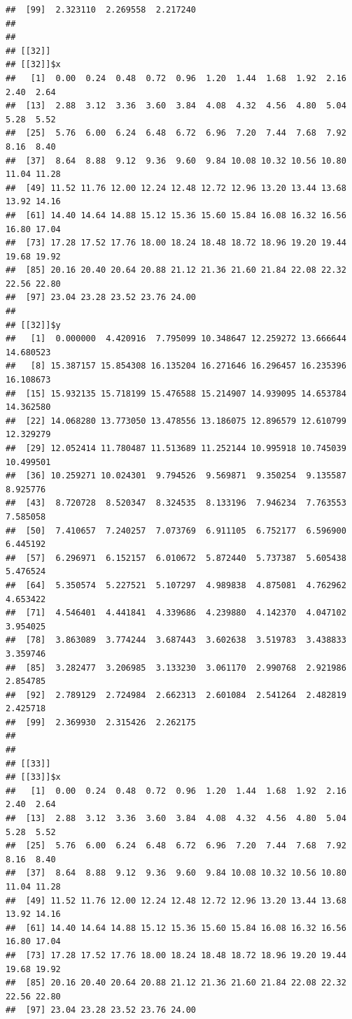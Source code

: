 \documentclass[
  ignorenonframetext,
]{beamer}
\begin{document}
\begin{frame}[fragile]{}
\begin{verbatim}
##  [99]  2.323110  2.269558  2.217240
## 
## 
## [[32]]
## [[32]]$x
##   [1]  0.00  0.24  0.48  0.72  0.96  1.20  1.44  1.68  1.92  2.16  2.40  2.64
##  [13]  2.88  3.12  3.36  3.60  3.84  4.08  4.32  4.56  4.80  5.04  5.28  5.52
##  [25]  5.76  6.00  6.24  6.48  6.72  6.96  7.20  7.44  7.68  7.92  8.16  8.40
##  [37]  8.64  8.88  9.12  9.36  9.60  9.84 10.08 10.32 10.56 10.80 11.04 11.28
##  [49] 11.52 11.76 12.00 12.24 12.48 12.72 12.96 13.20 13.44 13.68 13.92 14.16
##  [61] 14.40 14.64 14.88 15.12 15.36 15.60 15.84 16.08 16.32 16.56 16.80 17.04
##  [73] 17.28 17.52 17.76 18.00 18.24 18.48 18.72 18.96 19.20 19.44 19.68 19.92
##  [85] 20.16 20.40 20.64 20.88 21.12 21.36 21.60 21.84 22.08 22.32 22.56 22.80
##  [97] 23.04 23.28 23.52 23.76 24.00
## 
## [[32]]$y
##   [1]  0.000000  4.420916  7.795099 10.348647 12.259272 13.666644 14.680523
##   [8] 15.387157 15.854308 16.135204 16.271646 16.296457 16.235396 16.108673
##  [15] 15.932135 15.718199 15.476588 15.214907 14.939095 14.653784 14.362580
##  [22] 14.068280 13.773050 13.478556 13.186075 12.896579 12.610799 12.329279
##  [29] 12.052414 11.780487 11.513689 11.252144 10.995918 10.745039 10.499501
##  [36] 10.259271 10.024301  9.794526  9.569871  9.350254  9.135587  8.925776
##  [43]  8.720728  8.520347  8.324535  8.133196  7.946234  7.763553  7.585058
##  [50]  7.410657  7.240257  7.073769  6.911105  6.752177  6.596900  6.445192
##  [57]  6.296971  6.152157  6.010672  5.872440  5.737387  5.605438  5.476524
##  [64]  5.350574  5.227521  5.107297  4.989838  4.875081  4.762962  4.653422
##  [71]  4.546401  4.441841  4.339686  4.239880  4.142370  4.047102  3.954025
##  [78]  3.863089  3.774244  3.687443  3.602638  3.519783  3.438833  3.359746
##  [85]  3.282477  3.206985  3.133230  3.061170  2.990768  2.921986  2.854785
##  [92]  2.789129  2.724984  2.662313  2.601084  2.541264  2.482819  2.425718
##  [99]  2.369930  2.315426  2.262175
## 
## 
## [[33]]
## [[33]]$x
##   [1]  0.00  0.24  0.48  0.72  0.96  1.20  1.44  1.68  1.92  2.16  2.40  2.64
##  [13]  2.88  3.12  3.36  3.60  3.84  4.08  4.32  4.56  4.80  5.04  5.28  5.52
##  [25]  5.76  6.00  6.24  6.48  6.72  6.96  7.20  7.44  7.68  7.92  8.16  8.40
##  [37]  8.64  8.88  9.12  9.36  9.60  9.84 10.08 10.32 10.56 10.80 11.04 11.28
##  [49] 11.52 11.76 12.00 12.24 12.48 12.72 12.96 13.20 13.44 13.68 13.92 14.16
##  [61] 14.40 14.64 14.88 15.12 15.36 15.60 15.84 16.08 16.32 16.56 16.80 17.04
##  [73] 17.28 17.52 17.76 18.00 18.24 18.48 18.72 18.96 19.20 19.44 19.68 19.92
##  [85] 20.16 20.40 20.64 20.88 21.12 21.36 21.60 21.84 22.08 22.32 22.56 22.80
##  [97] 23.04 23.28 23.52 23.76 24.00

\end{verbatim}
\end{frame}
\end{document}
